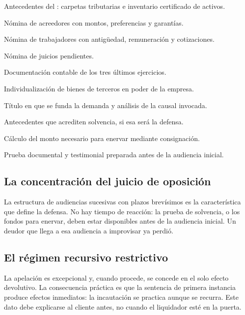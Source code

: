 \begin{checklist}
  \item Antecedentes del : carpetas tributarias e inventario certificado de
  activos.
  \item Nómina de acreedores con montos, preferencias y garantías.
  \item Nómina de trabajadores con antigüedad, remuneración y cotizaciones.
  \item Nómina de juicios pendientes.
  \item Documentación contable de los tres últimos ejercicios.
  \item Individualización de bienes de terceros en poder de la empresa.
\end{checklist}

\begin{checklist}
  \item Título en que se funda la demanda y análisis de la causal invocada.
  \item Antecedentes que acrediten solvencia, si esa será la defensa.
  \item Cálculo del monto necesario para enervar mediante consignación.
  \item Prueba documental y testimonial preparada antes de la audiencia inicial.
\end{checklist}

\bloqueFocos

\subsection{La concentración del juicio de oposición}

La estructura de audiencias sucesivas con plazos brevísimos es la característica que
define la defensa. No hay tiempo de reacción: la prueba de solvencia, o los fondos para
enervar, deben estar disponibles antes de la audiencia inicial. Un deudor que llega a
esa audiencia a improvisar ya perdió.

\subsection{El régimen recursivo restrictivo}

La apelación es excepcional y, cuando procede, se concede en el solo efecto devolutivo.
La consecuencia práctica es que la sentencia de primera instancia produce efectos
inmediatos: la incautación se practica aunque se recurra. Este dato debe explicarse al
cliente antes, no cuando el liquidador esté en la puerta.

